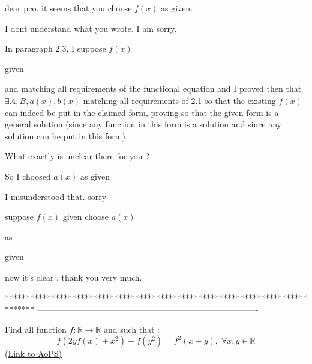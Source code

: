 \begin{solution}
	\begin{tcolorbox}dear pco. it seems that you choose $f(x)$ as given.\end{tcolorbox}

I dont understand what you wrote. I am sorry.

In paragraph 2.3, I suppose $f(x)$ \begin{bolded}\begin{italicized}given \end{italicized}\end{bolded} and matching all requirements of the functional equation and I proved then that $\exists A,B,a(x),b(x)$ matching all requirements of 2.1 so that the existing $f(x)$ can indeed be put in the claimed form, proving so that the given form is a general solution (since any function in this form is a solution and since any solution can be put in this form).

What exactly is unclear there for you ?

\end{solution}



\begin{solution}
	\begin{tcolorbox}
So I choosed $a(x)$ as given \end{tcolorbox}

I misunderstood that. sorry 

suppose $f(x)$ given
choose $a(x)$ \begin{bolded}as\end{bolded} given

now it's clear . thank you very much.
\end{solution}
*******************************************************************************
-------------------------------------------------------------------------------

\begin{problem}
	Find all function $f:\mathbb{R}\rightarrow \mathbb{R}$ and such that :
\[f(2yf(x)+x^2)+f(y^2)=f^2(x+y),\;\forall x,y\in \mathbb{R}\]
	\flushright \href{https://artofproblemsolving.com/community/c6h618048}{(Link to AoPS)}
\end{problem}



